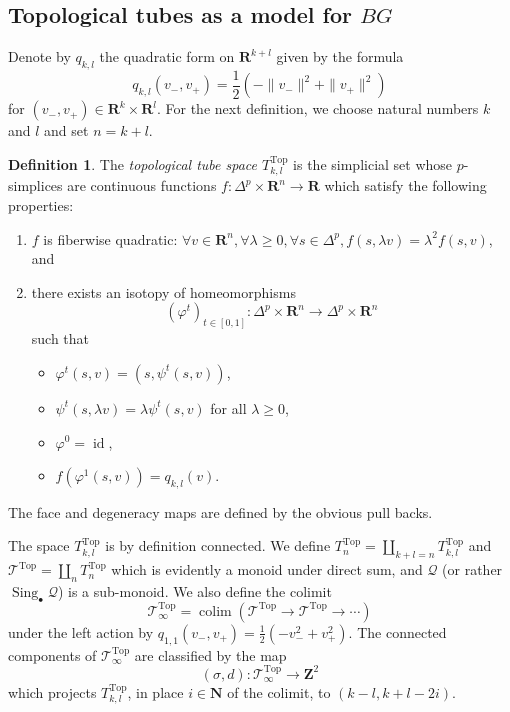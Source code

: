 \documentclass[reqno]{amsart}
\newcommand{\THOMAS}[1]%
	{\begin{quotation}{\footnotesize\textcolor{brown}{\textbf{Thomas:} #1}}\end{quotation}}
\theoremstyle{theorem}
\theoremstyle{remark}
\theoremstyle{definition}
\newtheorem{definition}[corollary]{Definition}
\DeclareMathOperator*{\colim}{colim}
\newcommand{\T}{\mathcal{T}}
\newcommand{\R}{\mathbf{R}}
\newcommand{\Z}{\mathbf{Z}}
\newcommand{\N}{\mathbf{N}}
\newcommand{\QQ}{\mathcal{Q}}
\DeclareMathOperator{\sing}{Sing}
\newcommand{\TOP}{\mathrm{Top}}
\DeclareMathOperator{\id}{id}
\begin{document}


\subsection{Topological tubes as a model for $BG$}


Denote by $q_{k,l}$ the quadratic form on $\R^{k+l}$ given by the formula 
\[q_{k,l}(v_-,v_+)=\frac{1}{2}(-\|v_-\|^2+\|v_+\|^2)\]
for $(v_-,v_+)\in \R^k\times \R^l$.
For the next definition, we choose natural numbers $k$ and $l$ and set $n=k+l$.
\begin{definition}\label{def:Ttop}
The \emph{topological tube space  $T^\TOP_{k,l}$} is the simplicial set whose $p$-simplices are continuous functions $f:\Delta^p \times \R^n\to \R$ which satisfy the following properties:
\begin{enumerate}
\item $f$ is fiberwise quadratic: $\forall v \in \R^n, \forall \lambda \geq 0, \forall s\in \Delta^p, f(s,\lambda v)=\lambda^2 f(s,v)$, and
\item there exists an isotopy of homeomorphisms 
\[(\varphi^t)_{t\in[0,1]}:\Delta^p\times \R^n\to \Delta^p\times \R^n\]
such that
\begin{itemize}
\item $\varphi^t(s,v)=(s,\psi^t(s,v))$,
\item $\psi^t(s,\lambda v)=\lambda\psi^t(s,v)$ for all $\lambda \geq 0$,
\item $\varphi^0=\id$,
\item $f(\varphi^1(s,v))=q_{k,l}(v)$.
\end{itemize}
\end{enumerate}
The face and degeneracy maps are defined by the obvious pull backs. 
\end{definition}


The space $T^\TOP_{k,l}$ is by definition connected. We define $T^\TOP_n=\coprod_{k+l=n} T^\TOP_{k,l}$ and $\T^\TOP=\coprod_n T^\TOP_n$
which is evidently a monoid under direct sum, and $\QQ$ (or rather $\sing_\bullet \QQ$) is a sub-monoid. We also define the colimit
\[\T^\TOP_\infty=\colim(\T^\TOP \to \T^\TOP \to \cdots)\]
under the left action by $q_{1,1}(v_-,v_+)=\frac{1}{2}(-v_-^2+v_+^2)$. The connected components of $\T^\TOP_\infty$ are classified by the map 
\[(\sigma,d):\T^\TOP_\infty \to \Z^2\] which projects $T_{k,l}^\TOP$, in place $i\in \N$ of the colimit, to $(k-l,k+l-2i)$.
\end{document}

